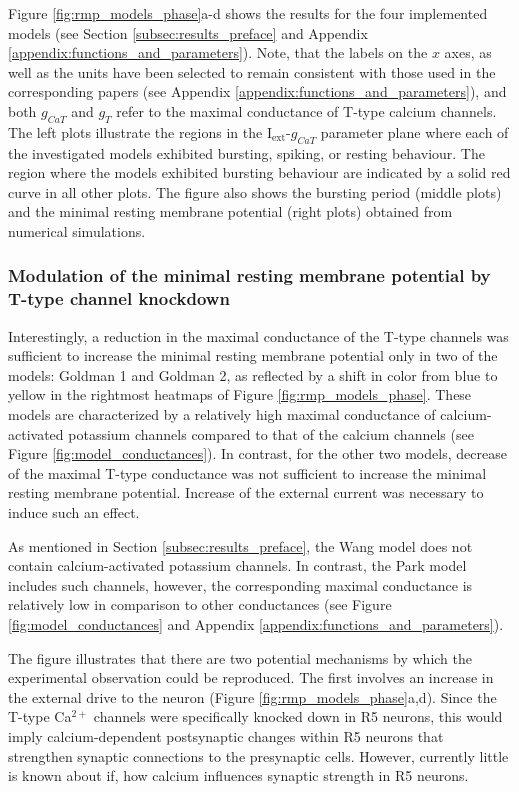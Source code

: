 \documentclass[../main.tex]{subfiles}
\begin{document}
Figure \ref{fig:rmp_models_phase}a-d shows the results for the four implemented models (see Section \ref{subsec:results_preface} and Appendix \ref{appendix:functions_and_parameters}).
Note, that the labels on the $x$ axes, as well as the units have been selected to remain consistent with those used in the corresponding papers (see Appendix \ref{appendix:functions_and_parameters}), and both $g_{CaT}$ and $g_T$ refer to the maximal conductance of T-type calcium channels.
The left plots illustrate the regions in the I$_{\text{ext}}$-$g_{CaT}$ parameter plane where each of the investigated models exhibited bursting, spiking, or resting behaviour. The region where the models exhibited bursting behaviour are indicated by a solid red curve in all other plots. The figure also shows the bursting period (middle plots) and the minimal resting membrane potential (right plots) obtained from numerical simulations.

\subsubsection{Modulation of the minimal resting membrane potential by T-type channel knockdown}

Interestingly, a reduction in the maximal conductance of the T-type channels was sufficient to increase the minimal resting membrane potential only in two of the models: Goldman 1 and Goldman 2, as reflected by a shift in color from blue to yellow in the rightmost heatmaps of Figure \ref{fig:rmp_models_phase}. These models are characterized by a relatively high maximal conductance of calcium-activated potassium channels compared to that of the calcium channels (see Figure \ref{fig:model_conductances}).
In contrast, for the other two models, decrease of the maximal T-type conductance was not sufficient to increase the minimal resting membrane potential. Increase of the external current was necessary to induce such an effect.

As mentioned in Section \ref{subsec:results_preface}, the Wang model does not contain calcium-activated potassium channels. In contrast, the Park model includes such channels, however, the corresponding maximal conductance is relatively low in comparison to other conductances (see Figure \ref{fig:model_conductances} and Appendix \ref{appendix:functions_and_parameters}).

The figure illustrates that there are two potential mechanisms by which the experimental observation could be reproduced. The first involves an increase in the external drive to the neuron (Figure \ref{fig:rmp_models_phase}a,d). Since the T-type Ca$^{2+}$ channels were specifically knocked down in R5 neurons, this would imply calcium-dependent postsynaptic changes within R5 neurons that strengthen synaptic connections to the presynaptic cells. However, currently little is known about if, how calcium influences synaptic strength in R5 neurons.
\end{document}

